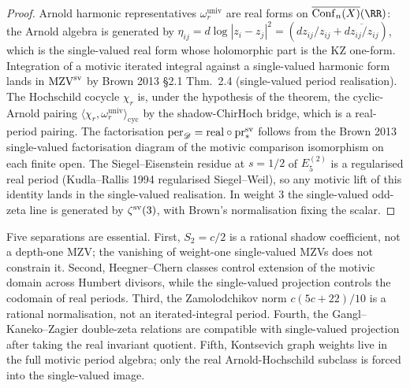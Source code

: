 \begin{proof}
Arnold harmonic representatives $\omega_r^{\mathrm{univ}}$ are real
forms on $\overline{\mathrm{Conf}_n(X)}(\RR)$: the Arnold algebra
is generated by
$\eta_{ij} = d\log|z_i - z_j|^2 = (dz_{ij}/z_{ij} + \overline{dz_{ij}/z_{ij}})$,
which is the single-valued real form whose holomorphic part is
the KZ one-form. Integration of a motivic iterated integral
against a single-valued harmonic form lands in $\mathrm{MZV}^{\mathrm{sv}}$ by
Brown 2013 \S 2.1 Thm.~2.4 (single-valued period realisation). The
Hochschild cocycle $\chi_r$ is, under the hypothesis of the theorem, the
cyclic-Arnold pairing
$\langle\chi_r,\omega_r^{\mathrm{univ}}\rangle_{\mathrm{cyc}}$ by
the shadow-ChirHoch bridge, which is a real-period pairing. The factorisation
$\mathrm{per}_{\mathscr D} = \mathrm{real}\circ\mathrm{pr}^{\mathrm{sv}}_*$ follows from the
Brown 2013 single-valued factorisation diagram of the motivic
comparison isomorphism on each finite open. The Siegel--Eisenstein
residue at $s=1/2$ of
$E_5^{(2)}$ is a regularised real period
(Kudla--Rallis 1994 regularised Siegel--Weil), so any motivic lift of
this identity lands in the single-valued realisation. In weight $3$ the
single-valued odd-zeta line is generated by $\zeta^{\mathrm{sv}}(3)$, with Brown's
normalisation fixing the scalar.
\end{proof}

\begin{remark}
\label{rem:sv-scope-five-obstructions}
Five separations are essential. First, $S_2=c/2$ is a rational shadow
coefficient, not a depth-one MZV; the vanishing of weight-one
single-valued MZVs does not constrain it. Second, Heegner--Chern
classes control extension of the motivic domain across Humbert
divisors, while the single-valued projection controls the codomain of
real periods. Third, the Zamolodchikov norm $c(5c+22)/10$ is a rational
normalisation, not an iterated-integral period. Fourth, the
Gangl--Kaneko--Zagier double-zeta relations are compatible with
single-valued projection after taking the real invariant quotient.
Fifth, Kontsevich graph weights live in the full motivic period algebra;
only the real Arnold-Hochschild subclass is forced into the
single-valued image.
\end{remark}

